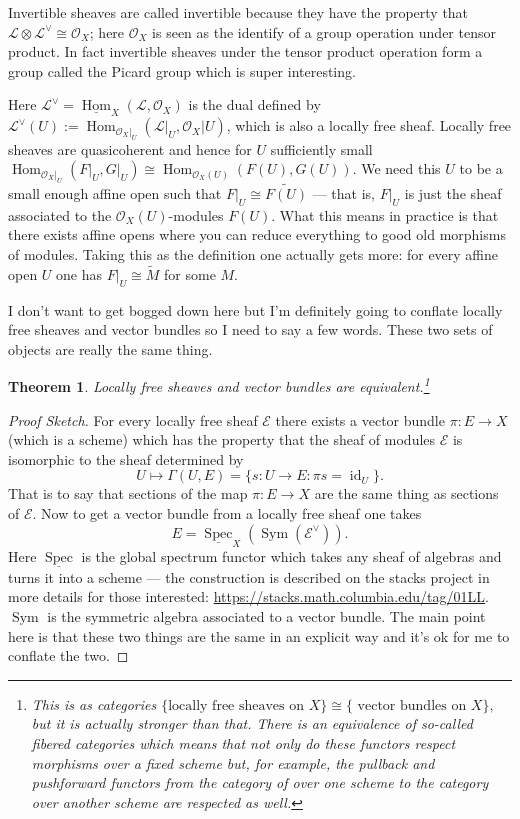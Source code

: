\documentclass[12pt]{article}
\numberwithin{equation}{section}
\newtheorem{theorem}{Theorem}[subsection]
\theoremstyle{definition}
\theoremstyle{remark}
\newcommand{\id}{\operatorname{id}}
\newcommand{\Hom}{\operatorname{Hom}}
\newcommand{\Ocal}{\mathcal{O}}
\newcommand{\Spec}{\operatorname{Spec}}
\newcommand{\Lcal}{\mathcal{L}}
\newcommand{\Ecal}{\mathcal{E}}
\newcommand{\Sym}{\operatorname{Sym}}
\begin{document}
Invertible sheaves are called invertible because they have the property that $\Lcal \otimes \Lcal^{\vee} \cong \Ocal_X$; here $\Ocal_X$ is seen as the identify of a group operation under tensor product. 
In fact invertible sheaves under the tensor product operation form a group called the Picard group which is super interesting. 	

Here $\Lcal^{\vee} = \underline{\Hom}_X(\Lcal,\Ocal_X)$ is the dual defined by  $\Lcal^{\vee}(U) := \Hom_{\Ocal_X\vert_U}(\Lcal\vert_U, \Ocal_X\vert U)$, which is also a locally free sheaf.
	Locally free sheaves are quasicoherent and hence for $U$ sufficiently small $\Hom_{\Ocal_X\vert_U}(F\vert_U,G\vert_U) \cong \Hom_{\Ocal_X(U)}(F(U),G(U))$. %
	We need this $U$ to be a small enough affine open such that $F\vert_U \cong \widetilde{F(U)}$ --- that is, $F\vert_U$ is just the sheaf associated to the $\Ocal_X(U)$-modules $F(U)$.
	What this means in practice is that there exists affine opens where you can reduce everything to good old morphisms of modules. 
	Taking this as the definition one actually gets more: for every affine open $U$ one has $F\vert_U \cong \widetilde{M}$ for some $M$. 


I don't want to get bogged down here but I'm definitely going to conflate locally free sheaves and vector bundles so I need to say a few words. 
These two sets of objects are really the same thing.

\begin{theorem}
	Locally free sheaves and vector bundles are equivalent.\footnote{This is as categories 
		$\lbrace \mbox{locally free sheaves on $X$} \rbrace \cong \lbrace \mbox{ vector bundles on $X$}\rbrace, $
		but it is actually stronger than that. There is an equivalence of so-called fibered categories which means that not only do these functors respect morphisms over a fixed scheme but, for example, the pullback and pushforward functors from the category of over one scheme to the category over another scheme are respected as well.}
\end{theorem}
\begin{proof}[Proof Sketch]
For every locally free sheaf $\Ecal$ there exists a vector bundle $\pi:E \to X$ (which is a scheme) which has the property that the sheaf of modules $\Ecal$ is isomorphic to the sheaf determined by 
  $$U\mapsto \Gamma(U,E) =\lbrace s:U\to E \colon \pi s = \id_U \rbrace.$$ 
That is to say that sections of the map $\pi: E\to X$ are the same thing as sections of $\Ecal$.
Now to get a vector bundle from a locally free sheaf one takes 
$$E = \underline{\Spec}_X( \Sym(\Ecal^{\vee}) ).$$ 
Here $\underline{\Spec}$ is the global spectrum functor which takes any sheaf of algebras and turns it into a scheme --- the construction is described on the stacks project in more details for those interested: \url{https://stacks.math.columbia.edu/tag/01LL}. $\Sym$ is the symmetric algebra associated to a vector bundle. The main point here is that these two things are the same in an explicit way and it's ok for me to conflate the two.
\end{proof}
\end{document}

